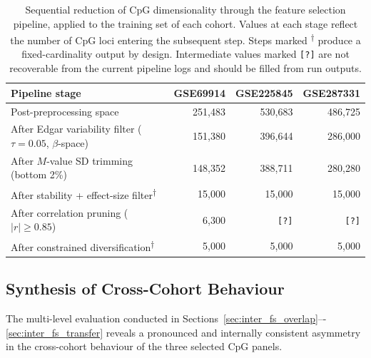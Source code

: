 \begin{table}[t]
\centering
\scriptsize
\caption{%
  Sequential reduction of CpG dimensionality through the feature
  selection pipeline, applied to the training set of each cohort.
  Values at each stage reflect the number of CpG loci entering the
  subsequent step. Steps marked \textsuperscript{$\dagger$} produce
  a fixed-cardinality output by design.
  Intermediate values marked \texttt{[?]} are not recoverable from
  the current pipeline logs and should be filled from run outputs.
}
\label{tab:fs_reduction_steps_all}
\begin{tabular}{l r r r}
\toprule
Pipeline stage & GSE69914 & GSE225845 & GSE287331 \\
\midrule
Post-preprocessing space           & 251{,}483 & 530{,}683 & 486{,}725 \\
After Edgar variability filter ($\tau{=}0.05$, $\beta$-space)
                                   & 151{,}380 & 396{,}644 & 286{,}000 \\
After $M$-value SD trimming (bottom 2\%)
                                   & 148{,}352 & 388{,}711 & 280{,}280 \\
After stability + effect-size filter\textsuperscript{$\dagger$}
                                   & 15{,}000  & 15{,}000  & 15{,}000  \\
After correlation pruning ($|r|\geq 0.85$)
                                   & 6{,}300   & \texttt{[?]} & \texttt{[?]} \\
After constrained diversification\textsuperscript{$\dagger$}
                                   & 5{,}000   & 5{,}000   & 5{,}000   \\
\bottomrule
\end{tabular}
\end{table}


\subsection{Synthesis of Cross-Cohort Behaviour}
\label{sec:inter_fs_synthesis}

The multi-level evaluation conducted in Sections~\ref{sec:inter_fs_overlap}–-%
\ref{sec:inter_fs_transfer} reveals a pronounced and internally consistent
asymmetry in the cross-cohort behaviour of the three selected CpG panels.

